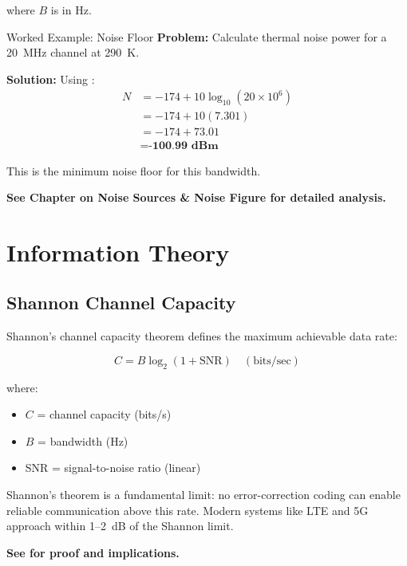 where $B$ is in Hz.

\begin{calloutbox}{Worked Example: Noise Floor}
\textbf{Problem:} Calculate thermal noise power for a 20~MHz channel at 290~K.

\textbf{Solution:} Using :
\begin{align*}
N &= -174 + 10\log_{10}(20 \times 10^6) \\
&= -174 + 10(7.301) \\
&= -174 + 73.01 \\
&= \textbf{-100.99~dBm}
\end{align*}

This is the minimum noise floor for this bandwidth.
\end{calloutbox}

\textbf{See Chapter on Noise Sources \& Noise Figure for detailed analysis.}

\section{Information Theory}
\label{sec:information-theory}

\subsection{Shannon Channel Capacity}
\label{subsec:shannon-capacity}

Shannon's channel capacity theorem defines the maximum achievable data rate:

\begin{equation}
\label{eq:shannon-capacity}
C = B \log_2(1 + \text{SNR}) \quad (\text{bits/sec})
\end{equation}

where:
\begin{itemize}
\item $C$ = channel capacity (bits/s)
\item $B$ = bandwidth (Hz)
\item SNR = signal-to-noise ratio (linear)
\end{itemize}

\begin{keyconcept}
Shannon's theorem is a fundamental limit: no error-correction coding can enable reliable communication above this rate. Modern systems like LTE and 5G approach within 1--2~dB of the Shannon limit.
\end{keyconcept}

\textbf{See  for proof and implications.}

